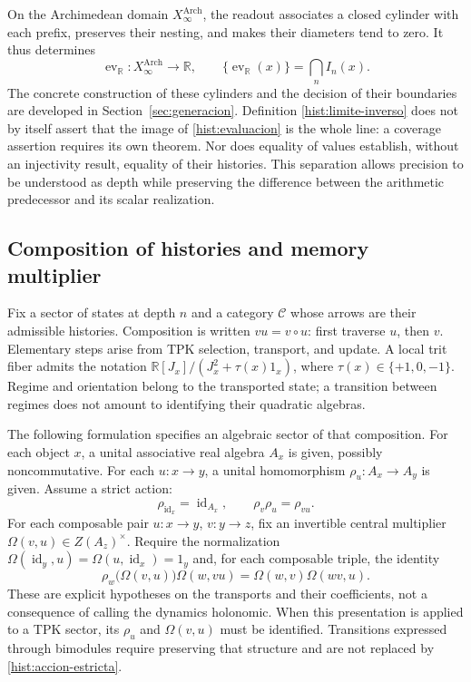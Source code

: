 On the Archimedean domain \(X_\infty^{\mathrm{Arch}}\), the readout associates
a closed cylinder with each prefix, preserves their nesting, and makes
their diameters tend to zero. It thus determines
\begin{equation}
 \operatorname{ev}_{\mathbb R}:X_\infty^{\mathrm{Arch}}\longrightarrow
 \mathbb R,\qquad
 \{\operatorname{ev}_{\mathbb R}(x)\}=\bigcap_n I_n(x).
 \label{hist:evaluacion}
\end{equation}
The concrete construction of these cylinders and the decision of their boundaries
are developed in Section~\ref{sec:generacion}. Definition
\eqref{hist:limite-inverso} does not by itself assert that the image of
\eqref{hist:evaluacion} is the whole line: a coverage assertion
requires its own theorem. Nor does equality of values establish,
without an injectivity result, equality of their histories. This separation
allows precision to be understood as depth while preserving the difference
between the arithmetic predecessor and its scalar realization.

\subsection{Composition of histories and memory multiplier}
\label{hist:algebra}

Fix a sector of states at depth \(n\) and a category
\(\mathcal C\) whose arrows are their admissible histories. Composition
is written \(vu=v\circ u\): first traverse \(u\), then \(v\).
Elementary steps arise from TPK selection, transport, and
update. A local trit fiber admits the notation
\(\mathbb R[J_x]/(J_x^2+\tau(x)1_x)\), where
\(\tau(x)\in\{+1,0,-1\}\). Regime and orientation belong to the
transported state; a transition between regimes does not amount to
identifying their quadratic algebras.

The following formulation specifies an algebraic sector of that composition.
For each object \(x\), a unital associative real algebra \(A_x\)
is given, possibly noncommutative. For each \(u:x\to y\), a
unital homomorphism \(\rho_u:A_x\to A_y\) is given. Assume a strict action:
\begin{equation}
 \rho_{\operatorname{id}_x}=\operatorname{id}_{A_x},\qquad
 \rho_v\rho_u=\rho_{vu}.
 \label{hist:accion-estricta}
\end{equation}
For each composable pair \(u:x\to y\), \(v:y\to z\), fix an
invertible central multiplier
\(\Omega(v,u)\in Z(A_z)^\times\). Require the normalization
\(\Omega(\operatorname{id}_y,u)=\Omega(u,\operatorname{id}_x)=1_y\)
and, for each composable triple, the identity
\begin{equation}
 \rho_w\bigl(\Omega(v,u)\bigr)\Omega(w,vu)
   =\Omega(w,v)\Omega(wv,u).
 \label{hist:cociclo}
\end{equation}
These are explicit hypotheses on the transports and their coefficients, not a
consequence of calling the dynamics holonomic. When this presentation is applied
to a TPK sector, its \(\rho_u\) and \(\Omega(v,u)\) must be identified.
Transitions expressed through bimodules require preserving that
structure and are not replaced by \eqref{hist:accion-estricta}.

